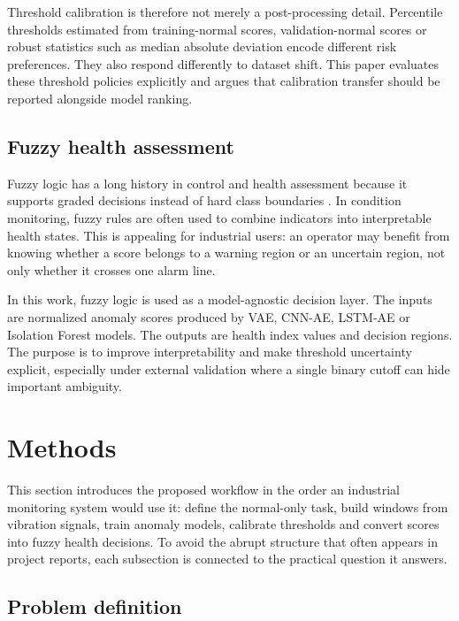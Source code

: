 \documentclass[pdflatex,sn-mathphys-num]{sn-jnl}
\begin{document}
Threshold calibration is therefore not merely a post-processing detail. Percentile thresholds estimated from training-normal scores, validation-normal scores or robust statistics such as median absolute deviation encode different risk preferences. They also respond differently to dataset shift. This paper evaluates these threshold policies explicitly and argues that calibration transfer should be reported alongside model ranking.

\subsection{Fuzzy health assessment}

Fuzzy logic has a long history in control and health assessment because it supports graded decisions instead of hard class boundaries \citep{zadeh1965fuzzy}. In condition monitoring, fuzzy rules are often used to combine indicators into interpretable health states. This is appealing for industrial users: an operator may benefit from knowing whether a score belongs to a warning region or an uncertain region, not only whether it crosses one alarm line.

In this work, fuzzy logic is used as a model-agnostic decision layer. The inputs are normalized anomaly scores produced by VAE, CNN-AE, LSTM-AE or Isolation Forest models. The outputs are health index values and decision regions. The purpose is to improve interpretability and make threshold uncertainty explicit, especially under external validation where a single binary cutoff can hide important ambiguity.



\section{Methods}
\label{sec:methods}

This section introduces the proposed workflow in the order an industrial monitoring system would use it: define the normal-only task, build windows from vibration signals, train anomaly models, calibrate thresholds and convert scores into fuzzy health decisions. To avoid the abrupt structure that often appears in project reports, each subsection is connected to the practical question it answers.

\subsection{Problem definition}
\end{document}
